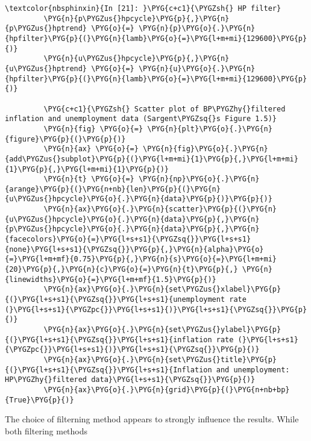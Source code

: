 \documentclass[letterpaper,10pt,openany,oneside,english]{sphinxmanual}
\begin{document}
\begin{Verbatim}[commandchars=\\\{\}]
\textcolor{nbsphinxin}{In [21]: }\PYG{c+c1}{\PYGZsh{} HP filter}
         \PYG{n}{p\PYGZus{}hpcycle}\PYG{p}{,}\PYG{n}{p\PYGZus{}hptrend} \PYG{o}{=} \PYG{n}{p}\PYG{o}{.}\PYG{n}{hpfilter}\PYG{p}{(}\PYG{n}{lamb}\PYG{o}{=}\PYG{l+m+mi}{129600}\PYG{p}{)}
         \PYG{n}{u\PYGZus{}hpcycle}\PYG{p}{,}\PYG{n}{u\PYGZus{}hptrend} \PYG{o}{=} \PYG{n}{u}\PYG{o}{.}\PYG{n}{hpfilter}\PYG{p}{(}\PYG{n}{lamb}\PYG{o}{=}\PYG{l+m+mi}{129600}\PYG{p}{)}
         
         \PYG{c+c1}{\PYGZsh{} Scatter plot of BP\PYGZhy{}filtered inflation and unemployment data (Sargent\PYGZsq{}s Figure 1.5)}
         \PYG{n}{fig} \PYG{o}{=} \PYG{n}{plt}\PYG{o}{.}\PYG{n}{figure}\PYG{p}{(}\PYG{p}{)}
         \PYG{n}{ax} \PYG{o}{=} \PYG{n}{fig}\PYG{o}{.}\PYG{n}{add\PYGZus{}subplot}\PYG{p}{(}\PYG{l+m+mi}{1}\PYG{p}{,}\PYG{l+m+mi}{1}\PYG{p}{,}\PYG{l+m+mi}{1}\PYG{p}{)}
         \PYG{n}{t} \PYG{o}{=} \PYG{n}{np}\PYG{o}{.}\PYG{n}{arange}\PYG{p}{(}\PYG{n+nb}{len}\PYG{p}{(}\PYG{n}{u\PYGZus{}hpcycle}\PYG{o}{.}\PYG{n}{data}\PYG{p}{)}\PYG{p}{)}
         \PYG{n}{ax}\PYG{o}{.}\PYG{n}{scatter}\PYG{p}{(}\PYG{n}{u\PYGZus{}hpcycle}\PYG{o}{.}\PYG{n}{data}\PYG{p}{,}\PYG{n}{p\PYGZus{}hpcycle}\PYG{o}{.}\PYG{n}{data}\PYG{p}{,}\PYG{n}{facecolors}\PYG{o}{=}\PYG{l+s+s1}{\PYGZsq{}}\PYG{l+s+s1}{none}\PYG{l+s+s1}{\PYGZsq{}}\PYG{p}{,}\PYG{n}{alpha}\PYG{o}{=}\PYG{l+m+mf}{0.75}\PYG{p}{,}\PYG{n}{s}\PYG{o}{=}\PYG{l+m+mi}{20}\PYG{p}{,}\PYG{n}{c}\PYG{o}{=}\PYG{n}{t}\PYG{p}{,} \PYG{n}{linewidths}\PYG{o}{=}\PYG{l+m+mf}{1.5}\PYG{p}{)}
         \PYG{n}{ax}\PYG{o}{.}\PYG{n}{set\PYGZus{}xlabel}\PYG{p}{(}\PYG{l+s+s1}{\PYGZsq{}}\PYG{l+s+s1}{unemployment rate (}\PYG{l+s+s1}{\PYGZpc{}}\PYG{l+s+s1}{)}\PYG{l+s+s1}{\PYGZsq{}}\PYG{p}{)}
         \PYG{n}{ax}\PYG{o}{.}\PYG{n}{set\PYGZus{}ylabel}\PYG{p}{(}\PYG{l+s+s1}{\PYGZsq{}}\PYG{l+s+s1}{inflation rate (}\PYG{l+s+s1}{\PYGZpc{}}\PYG{l+s+s1}{)}\PYG{l+s+s1}{\PYGZsq{}}\PYG{p}{)}
         \PYG{n}{ax}\PYG{o}{.}\PYG{n}{set\PYGZus{}title}\PYG{p}{(}\PYG{l+s+s1}{\PYGZsq{}}\PYG{l+s+s1}{Inflation and unemployment: HP\PYGZhy{}filtered data}\PYG{l+s+s1}{\PYGZsq{}}\PYG{p}{)}
         \PYG{n}{ax}\PYG{o}{.}\PYG{n}{grid}\PYG{p}{(}\PYG{n+nb+bp}{True}\PYG{p}{)}
\end{Verbatim}

\noindent{}

The choice of filterning method appears to strongly influence the
results. While both filtering methods
\end{document}

